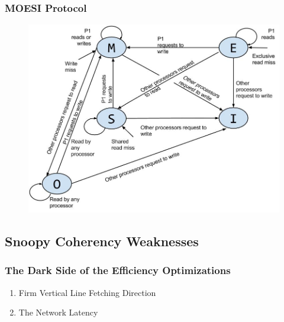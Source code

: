 \documentclass{beamer}
\begin{document}
\begin{frame}[plain]
	\frametitle{MOESI Protocol}
		\begin{figure}
			\includegraphics[width=1\linewidth]{img/MOESIstatediagram.jpg}
		\end{figure}
\end{frame}


\subsection{Snoopy Coherency Weaknesses}
\begin{frame}
	\frametitle{The Dark Side of the Efficiency Optimizations}
	\begin{enumerate}
		\Large
		\item Firm Vertical Line Fetching Direction
		\item The Network Latency
	\end{enumerate}
\end{frame}

\end{document}
